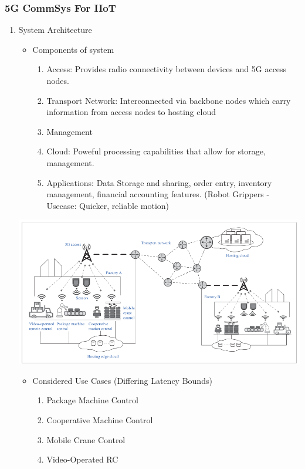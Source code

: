 \documentclass[11pt]{article}
\begin{document}
\subsubsection{5G CommSys For IIoT}
\label{sec:org8f0bc40}
\begin{enumerate}
\item System Architecture
\label{sec:org4dcecb3}
\begin{itemize}
\item Components of system
\begin{enumerate}
\item Access: Provides radio connectivity between devices and 5G access nodes.
\item Transport Network: Interconnected via backbone nodes which carry information from access nodes to hosting cloud
\item Management
\item Cloud: Poweful processing capabilities that allow for storage, management.
\item Applications: Data Storage and sharing, order entry, inventory management, financial accounting features. (Robot Grippers - Usecase: Quicker, reliable motion)
\end{enumerate}
\end{itemize}
\begin{center}
\includegraphics[scale=0.50]{./assets/p1f1.png}
\end{center}
\begin{itemize}
\item Considered Use Cases (Differing Latency Bounds)
\begin{enumerate}
\item Package Machine Control
\item Cooperative Machine Control
\item Mobile Crane Control
\item Video-Operated RC

\end{enumerate}
\end{itemize}
\end{enumerate}
\end{document}
